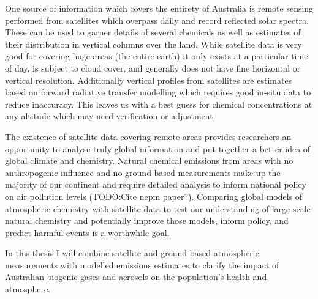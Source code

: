 One source of information which covers the entirety of Australia is remote sensing performed from satellites which overpass daily and record reflected solar spectra.
These can be used to garner details of several chemicals as well as estimates of their distribution in vertical columns over the land.
While satellite data is very good for covering huge areas (the entire earth) it only exists at a particular time of day, is subject to cloud cover, and generally does not have fine horizontal or vertical resolution.
Additionally vertical profiles from satellites are estimates based on forward radiative transfer modelling which requires good in-situ data to reduce inaccuracy.
This leaves us with a best guess for chemical concentrations at any altitude which may need verification or adjustment.

The existence of satellite data covering remote areas provides researchers an opportunity to analyse truly global information and put together a better idea of global climate and chemistry.
Natural chemical emissions from areas with no anthropogenic influence and no ground based measurements make up the majority of our continent \cite{VanDerA_2008} and require detailed analysis to inform national policy on air pollution levels (TODO:Cite nepm paper?).   
Comparing global models of atmospheric chemistry with satellite data to test our understanding of large scale natural chemistry and potentially improve those models, inform policy, and predict harmful events is a worthwhile goal.

In this thesis I will combine satellite and ground based atmospheric measurements with modelled emissions estimates to clarify the impact of Australian biogenic gases and aerosols on the population's health and atmosphere.